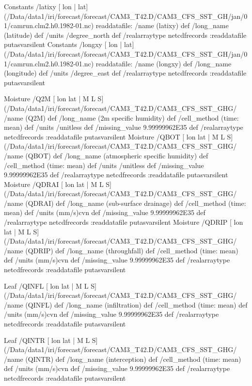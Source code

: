 \begin{ingrid}
Constants /latixy{
[ lon | lat] (/Data/data1/iri/forecast/forecast/CAM3_T42.D/CAM3_CFS_SST_GH/jan/01/camrun.clm2.h0.1982-01.nc) readdatafile:
/name (latixy) def
 /long_name (latitude) def
 /units /degree_north def
 /realarraytype netcdfrecords :readdatafile
}putasvarsilent
Constants /longxy{
[ lon | lat] (/Data/data1/iri/forecast/forecast/CAM3_T42.D/CAM3_CFS_SST_GH/jan/01/camrun.clm2.h0.1982-01.nc) readdatafile:
/name (longxy) def
 /long_name (longitude) def
 /units /degree_east def
 /realarraytype netcdfrecords :readdatafile
}putasvarsilent


Moisture /Q2M{
[ lon lat | M L S] (/Data/data1/iri/forecast/forecast/CAM3_T42.D/CAM3_CFS_SST_GHG/%
/name (Q2M) def
 /long_name (2m specific humidity) def
 /cell_method (time: mean) def
 /units /unitless def
 /missing_value 9.99999962E35 def
 /realarraytype netcdfrecords :readdatafile
}putasvarsilent
Moisture /QBOT{
[ lon lat | M L S] (/Data/data1/iri/forecast/forecast/CAM3_T42.D/CAM3_CFS_SST_GHG/%
/name (QBOT) def
 /long_name (atmospheric specific humidity) def
 /cell_method (time: mean) def
 /units /unitless def
 /missing_value 9.99999962E35 def
 /realarraytype netcdfrecords :readdatafile
}putasvarsilent
Moisture /QDRAI{
[ lon lat | M L S] (/Data/data1/iri/forecast/forecast/CAM3_T42.D/CAM3_CFS_SST_GHG/%
/name (QDRAI) def
 /long_name (sub-surface drainage) def
 /cell_method (time: mean) def
 /units (mm/s)cvn def
 /missing_value 9.99999962E35 def
 /realarraytype netcdfrecords :readdatafile
}putasvarsilent
Moisture /QDRIP{
[ lon lat | M L S] (/Data/data1/iri/forecast/forecast/CAM3_T42.D/CAM3_CFS_SST_GHG/%
/name (QDRIP) def
 /long_name (throughfall) def
 /cell_method (time: mean) def
 /units (mm/s)cvn def
 /missing_value 9.99999962E35 def
 /realarraytype netcdfrecords :readdatafile
}putasvarsilent

Leaf /QINFL{
[ lon lat | M L S] (/Data/data1/iri/forecast/forecast/CAM3_T42.D/CAM3_CFS_SST_GHG/%
/name (QINFL) def
 /long_name (infiltration) def
 /cell_method (time: mean) def
 /units (mm/s)cvn def
 /missing_value 9.99999962E35 def
 /realarraytype netcdfrecords :readdatafile
}putasvarsilent

Leaf /QINTR{
[ lon lat | M L S] (/Data/data1/iri/forecast/forecast/CAM3_T42.D/CAM3_CFS_SST_GHG/%
/name (QINTR) def
 /long_name (interception) def
 /cell_method (time: mean) def
 /units (mm/s)cvn def
 /missing_value 9.99999962E35 def
 /realarraytype netcdfrecords :readdatafile
}putasvarsilent


\end{ingrid}
